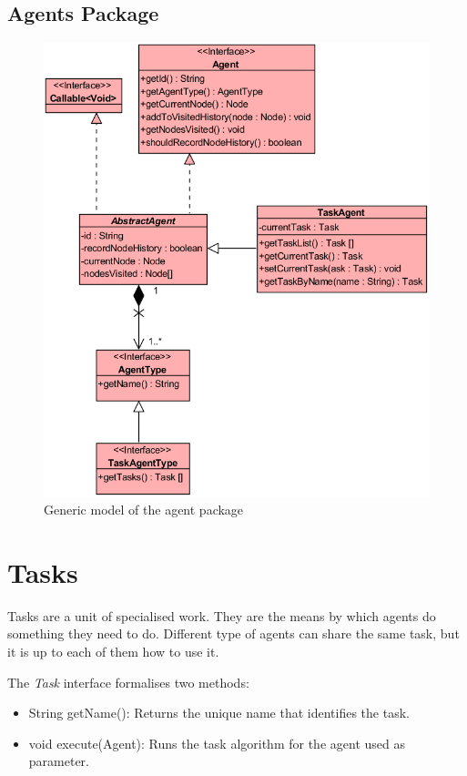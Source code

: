 \subsection{Agents Package}

\begin{figure}[H]
  \centering
  \includegraphics[width=0.9\linewidth]{gfx/uml-agent-package.png}
  \caption{Generic model of the agent package}
  \label{fig:gen-agent-package}
\end{figure}


\section {Tasks}

Tasks are a unit of specialised work. They are the means by which agents do something they need to do. Different type of agents can share the same task, but it is up to each of them how to use it.

The \emph{Task} interface formalises two methods:

\begin{itemize}
  \item String getName(): Returns the unique name that identifies the task.
  
  \item void execute(Agent): Runs the task algorithm for the agent used as parameter.
\end{itemize}

